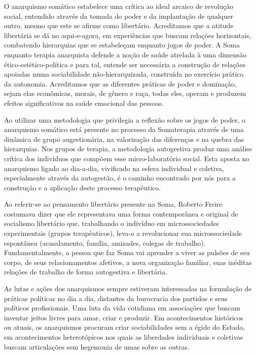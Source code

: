 O anarquismo somático estabelece uma crítica ao ideal arcaico de
revolução social, entendido através da tomada do poder e da implantação
de qualquer outro, mesmo que este se afirme como libertário. Acreditamos
que a atitude libertária se dá no aqui-e-agora, em experiências que
buscam relações horizontais, combatendo hierarquias que se estabeleçam
enquanto jogos de poder. A Soma enquanto terapia anarquista defende a
noção de saúde atrelada à uma dimensão ético-estético-política e para
tal, entende ser necessária a construção de relações apoiadas numa
sociabilidade não-hierarquizada, construída no exercício prático da
autonomia. Acreditamos que as diferentes práticas de poder e dominação,
sejam elas econômicas, morais, de gênero e raça, todas eles, operam e
produzem efeitos significativos na saúde emocional das pessoas.

Ao utilizar uma metodologia que privilegia a reflexão sobre os jogos de
poder, o anarquismo somático está presente no processo da Somaterapia
através de uma dinâmica de grupo augestionária, na valorização das
diferenças e na quebra das hierarquias. Nos grupos de terapia, a
metodologia autogestiva produz uma análise crítica dos indivíduos que
compõem esse micro-laboratório social. Esta aposta no anarquismo ligado
ao dia-a-dia, vivificado na esfera individual e coletiva, especialmente
através da autogestão, é o caminho encontrado por nós para a construção
e a aplicação deste processo terapêutico.

Ao referir-se ao pensamento libertário presente na Soma, Roberto Freire
costumava dizer que ele representava uma forma contemporânea e original
de socialismo libertário que, traba­lhando o indivíduo em
microssociedades experimentais (grupos terapêu­ticos), leva-o a
revolucionar sua microssociedade espontânea (acasala­mento, família,
amizades, colegas de trabalho). Fundamentalmente, a pessoa que faz So­ma
vai aprender a viver as pulsões de seu corpo, de seus relacionamentos
afetivos, a nova organização familiar, suas inéditas relações de
trabalho de forma autogestiva e libertária.

As lutas e ações dos anarquismos sempre estiveram interessadas na
formulação de práticas políticas no dia a dia, distantes da burocracia
dos partidos e seus políticos profissionais. Uma luta da vida cotidiana
em associações que buscam inventar jeitos livres para amar, criar e
produzir. Em acontecimentos históricos ou atuais, os anarquismos
procuram criar sociabilidades sem a égide do Estado, em acontecimentos
heterotópicos nos quais as liberdades individuais e coletivas buscam
articulações sem hegemonia de umas sobre as outras.

